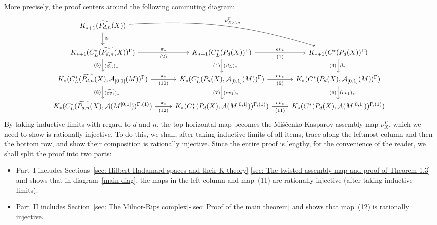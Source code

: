 \documentclass[11pt]{article}
\theoremstyle{definition}
\theoremstyle{plain}
\def\A{\mathcal A}\def\C{\mathcal C}\def\B{\mathcal B}\def\E{\mathcal E}\def\O{\mathcal O}\def\h{\mathfrak h}\def\K{\mathcal K}\def\F{\mathcal F}\def\P{\mathcal P}\def\L{\mathcal L}\def\R{\mathcal R}\def\Q{\mathcal Q}\def\H{\mathcal H}\def\S{\mathcal S}\def\N{\mathcal N}\def\U{\mathcal U}\def\V{\mathcal V}
\def\MRdnX{\widetilde{P_{d,n}}(X)}
\def\Ga{\Gamma}
\begin{document}
More precisely, the proof centers around the following commuting diagram:
\begin{equation}\begin{tikzcd}\label{main diag}
K^{\Ga}_{*+1}(\MRdnX) \arrow[drr, "\nu_{X,d,n}^\Ga",bend left=10]  \arrow[d, "\cong"] &&  \\
K_{*+1}(C^*_L(\MRdnX)^{\Ga}) \arrow[r, "\pi_*", "(2)"']  \arrow[d, "(\widetilde{\beta_L})_*", "(5)"'] & K_{*+1}(C^*_L(P_d(X))^{\Ga}) \arrow[r, "ev_*","(1)"'] \arrow[d, "(\beta_L)_*", "(4)"'] & K_{*+1}(C^*(P_d(X))^{\Ga}) \arrow[d, "\beta_*", "(3)"']   \\
K_*(C^*_L(\MRdnX,\A_{[0,1]}(M))^{\Ga}) \arrow[r, "\pi_*","(10)"'] \arrow[d, "(\widetilde{ev_1})_*", "(8)"']  & K_*(C^*_L(P_d(X),\A_{[0,1]}(M))^{\Ga})\arrow[r, "ev_*","(9)"'] \arrow[d, "(ev_1)_*","(7)"']& K_*(C^*(P_d(X),\A_{[0,1]}(M))^{\Ga}) \arrow[d, "(ev_1)_*","(6)"']\\
K_*(C^*_L(\MRdnX,\A(M^{[0,1]}))^{\Ga,(1)}) \arrow[r, "\pi_*","(12)"']& K_*(C^*_L(P_d(X),\A(M^{[0,1]}))^{\Ga,(1)})\arrow[r, "ev_*","(11)"'] & K_*(C^*(P_d(X),\A(M^{[0,1]}))^{\Ga,(1)})
\end{tikzcd}\end{equation}
By taking inductive limits with regard to $d$ and $n$, the top horizontal map becomes the Miščenko-Kasparov assembly map $\nu_X^{\Ga}$, which we need to show is rationally injective. To do this, 
we shall, after taking inductive limits of all items, trace along the leftmost column and then the bottom row, and show their composition is rationally injective. 
Since the entire proof is lengthy, for the convenience of the reader, we shall split the proof into two parts: 
\begin{itemize}
    \item Part~I includes Sections~\ref{sec: Hilbert-Hadamard spaces and their K-theory}-\ref{sec: The twisted assembly map and proof of Theorem 1.3} and shows that in diagram~\eqref{main diag}, the maps in the left column and map~(11) are rationally injective (after taking inductive limits). 
    \item Part~II includes Section~\ref{sec: The Milnor-Rips complex}-\ref{sec: Proof of the main theorem} and shows that map~(12) is rationally injective. 
\end{itemize}
\end{document}
